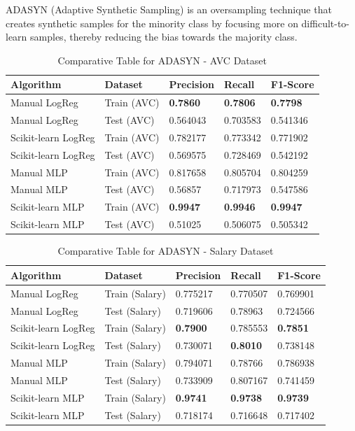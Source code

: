 \documentclass[a4paper,12pt]{article}
\begin{document}
ADASYN (Adaptive Synthetic Sampling) is an oversampling technique that creates synthetic samples for the minority class by focusing more on difficult-to-learn samples, thereby reducing the bias towards the majority class.

\begin{table}[h!]
    \centering
    \caption{Comparative Table for ADASYN - AVC Dataset}
    \begin{tabularx}{\textwidth}{|l|l|X|X|X|}
    \hline
    \textbf{Algorithm} & \textbf{Dataset} & \textbf{Precision} & \textbf{Recall} & \textbf{F1-Score} \\
    \hline
    Manual LogReg & Train (AVC) & \textbf{0.7860} & \textbf{0.7806} & \textbf{0.7798} \\
    Manual LogReg & Test (AVC) & 0.564043 & 0.703583 & 0.541346 \\
    Scikit-learn LogReg & Train (AVC) & 0.782177 & 0.773342 & 0.771902 \\
    Scikit-learn LogReg & Test (AVC) & 0.569575 & 0.728469 & 0.542192 \\
    Manual MLP & Train (AVC) & 0.817658 & 0.805704 & 0.804259 \\
    Manual MLP & Test (AVC) & 0.56857 & 0.717973 & 0.547586 \\
    Scikit-learn MLP & Train (AVC) & \textbf{0.9947} & \textbf{0.9946} & \textbf{0.9947} \\
    Scikit-learn MLP & Test (AVC) & 0.51025 & 0.506075 & 0.505342 \\
    \hline
    \end{tabularx}
\end{table}

\begin{table}[h!]
    \centering
    \caption{Comparative Table for ADASYN - Salary Dataset}
    \begin{tabularx}{\textwidth}{|l|l|X|X|X|}
    \hline
    \textbf{Algorithm} & \textbf{Dataset} & \textbf{Precision} & \textbf{Recall} & \textbf{F1-Score} \\
    \hline
    Manual LogReg & Train (Salary) & 0.775217 & 0.770507 & 0.769901 \\
    Manual LogReg & Test (Salary) & 0.719606 & 0.78963 & 0.724566 \\
    Scikit-learn LogReg & Train (Salary) & \textbf{0.7900} & 0.785553 & \textbf{0.7851} \\
    Scikit-learn LogReg & Test (Salary) & 0.730071 & \textbf{0.8010} & 0.738148 \\
    Manual MLP & Train (Salary) & 0.794071 & 0.78766 & 0.786938 \\
    Manual MLP & Test (Salary) & 0.733909 & 0.807167 & 0.741459 \\
    Scikit-learn MLP & Train (Salary) & \textbf{0.9741} & \textbf{0.9738} & \textbf{0.9739} \\
    Scikit-learn MLP & Test (Salary) & 0.718174 & 0.716648 & 0.717402 \\
    \hline
    \end{tabularx}
\end{table}
\end{document}
